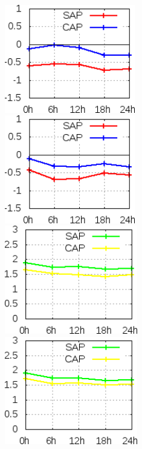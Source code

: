 \begin{figure}[!hbp]
\centering
\includegraphics[height=4.7cm]{./figs/VIES500temp0Z.png}\vspace{1.0cm}\hspace{1.0cm}\includegraphics[height=4.7cm]{./figs/VIES500temp12Z.png}
\includegraphics[height=4.7cm]{./figs/EQM500temp0Z.png}\vspace{1.0cm}\hspace{1.0cm}\includegraphics[height=4.7cm]{./figs/EQM500temp12Z.png}

\end{figure}
